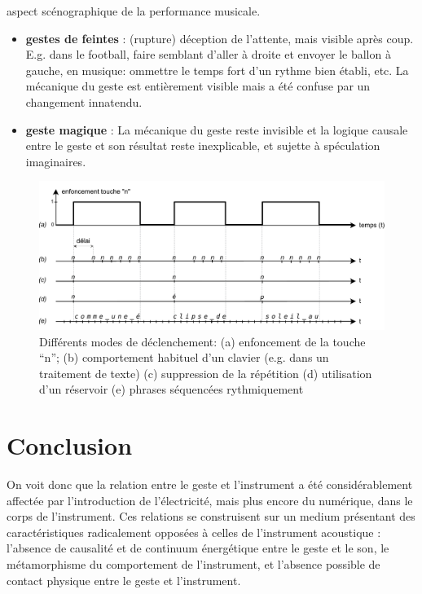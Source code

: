 aspect scénographique de la performance musicale.
\vspace{-1em}
\begin{itemize}[noitemsep]
\item \textbf{gestes de feintes} : (rupture) déception de l'attente, mais visible après coup. E.g. dans le football, faire semblant d'aller à droite et envoyer le ballon à gauche, en musique: ommettre le temps fort d'un rythme bien établi, etc. La mécanique du geste est entièrement visible mais a été confuse par un changement innatendu.
\item \textbf{geste magique} : La mécanique du geste reste invisible et la logique causale entre le geste et son résultat reste inexplicable, et sujette à spéculation imaginaires.
\end{itemize}


\begin{figure}[!htbp]
	\includegraphics[width=\textwidth]{gfx/03_gesture/key_modes.pdf}
	\caption{Différents modes de déclenchement: (a) enfoncement de la touche ``n''; (b) comportement habituel d'un clavier (e.g. dans un traitement de texte) (c) suppression de la répétition (d) utilisation d'un réservoir (e) phrases séquencées rythmiquement}
	\label{fig:gesture:triggering_modes}
\end{figure}

\section{Conclusion}
\label{sec:gesture:conclusion}


\noindent On voit donc que la relation entre le geste et l'instrument a été considérablement affectée par l'introduction de l'électricité, mais plus encore du numérique, dans le corps de l'instrument. Ces relations se construisent sur un medium présentant des caractéristiques radicalement opposées à celles de l'instrument acoustique : l'absence de causalité et de continuum énergétique entre le geste et le son, le métamorphisme du comportement de l'instrument, et l'absence possible de contact physique entre le geste et l'instrument.

